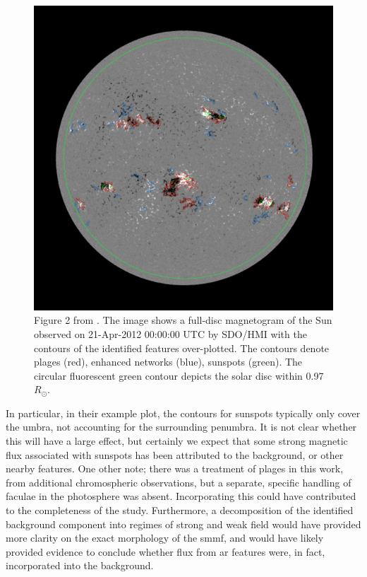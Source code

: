 \begin{figure}[ht!]
	\includegraphics[width=\columnwidth]{bose_nag_plot.jpg}
	\caption{Figure 2 from \citet{bose_variability_2018}. The image shows a full-disc magnetogram of the Sun observed on 21-Apr-2012 00:00:00 UTC by SDO/HMI with the contours of the identified features over-plotted. The contours denote plages (red), enhanced networks (blue), sunspots (green). The circular fluorescent green contour depicts the solar disc within 0.97 $R_\odot$.}
	\label{fig:bose_fig2}
\end{figure}



In particular, in their example plot, the contours for sunspots typically only cover the umbra, not accounting for the surrounding penumbra. It is not clear whether this will have a large effect, but certainly we expect that some strong magnetic flux associated with sunspots has been attributed to the background, or other nearby features. One other note; there was a treatment of plages in this work, from additional chromospheric observations, but a separate, specific handling of faculae in the photosphere was absent. Incorporating this could have contributed to the completeness of the study. Furthermore, a decomposition of the identified background component into regimes of strong and weak field would have provided more clarity on the exact morphology of the \gls{smmf}, and would have likely provided evidence to conclude whether flux from \gls{ar} features were, in fact, incorporated into the background.

